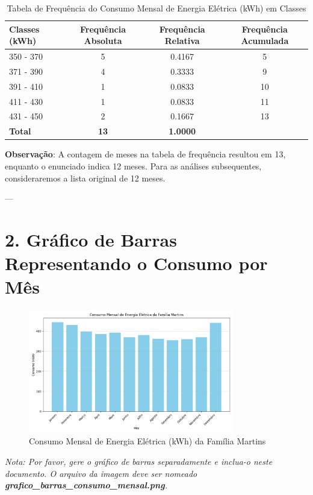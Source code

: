 \documentclass{article}
\begin{document}
\begin{table}[H]
    \centering
    \caption{Tabela de Frequência do Consumo Mensal de Energia Elétrica (kWh) em Classes}
    \begin{tabular}{|l|c|c|c|}
        \hline
        \textbf{Classes (kWh)} & \textbf{Frequência Absoluta} & \textbf{Frequência Relativa} & \textbf{Frequência Acumulada} \\
        \hline
        350 - 370 & 5 & 0.4167 & 5 \\
        371 - 390 & 4 & 0.3333 & 9 \\
        391 - 410 & 1 & 0.0833 & 10 \\
        411 - 430 & 1 & 0.0833 & 11 \\
        431 - 450 & 2 & 0.1667 & 13 \\ %
        \hline
        \textbf{Total} & \textbf{13} & \textbf{1.0000} & \\ %
        \hline
    \end{tabular}
\end{table}

\textbf{Observação}: A contagem de meses na tabela de frequência resultou em 13, enquanto o enunciado indica 12 meses. Para as análises subsequentes, consideraremos a lista original de 12 meses.

---

\section*{2. Gráfico de Barras Representando o Consumo por Mês}

\begin{figure}[H]
    \centering
    \includegraphics[width=0.8\textwidth]{grafico_barras_consumo_mensal.png} %
    \caption{Consumo Mensal de Energia Elétrica (kWh) da Família Martins}
    \label{fig:bar_chart}
\end{figure}
\textit{Nota: Por favor, gere o gráfico de barras separadamente e inclua-o neste documento. O arquivo da imagem deve ser nomeado \textbf{grafico\_barras\_consumo\_mensal.png}.}
\end{document}
